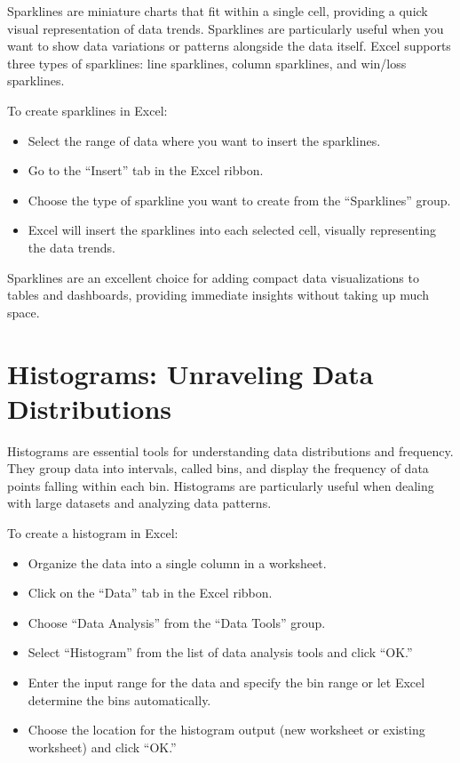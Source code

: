 \documentclass[
]{book}
\providecommand{\tightlist}{%
  \setlength{\itemsep}{0pt}\setlength{\parskip}{0pt}}
\begin{document}
Sparklines are miniature charts that fit within a single cell, providing a quick visual representation of data trends. Sparklines are particularly useful when you want to show data variations or patterns alongside the data itself. Excel supports three types of sparklines: line sparklines, column sparklines, and win/loss sparklines.

To create sparklines in Excel:

\begin{itemize}
\tightlist
\item
  Select the range of data where you want to insert the sparklines.
\item
  Go to the ``Insert'' tab in the Excel ribbon.
\item
  Choose the type of sparkline you want to create from the ``Sparklines'' group.
\item
  Excel will insert the sparklines into each selected cell, visually representing the data trends.
\end{itemize}

Sparklines are an excellent choice for adding compact data visualizations to tables and dashboards, providing immediate insights without taking up much space.

\hypertarget{histograms-unraveling-data-distributions}{%
\section{Histograms: Unraveling Data Distributions}\label{histograms-unraveling-data-distributions}}

Histograms are essential tools for understanding data distributions and frequency. They group data into intervals, called bins, and display the frequency of data points falling within each bin. Histograms are particularly useful when dealing with large datasets and analyzing data patterns.

To create a histogram in Excel:

\begin{itemize}
\tightlist
\item
  Organize the data into a single column in a worksheet.
\item
  Click on the ``Data'' tab in the Excel ribbon.
\item
  Choose ``Data Analysis'' from the ``Data Tools'' group.
\item
  Select ``Histogram'' from the list of data analysis tools and click ``OK.''
\item
  Enter the input range for the data and specify the bin range or let Excel determine the bins automatically.
\item
  Choose the location for the histogram output (new worksheet or existing worksheet) and click ``OK.''
\end{itemize}
\end{document}
